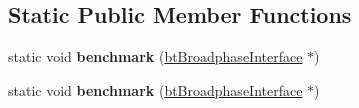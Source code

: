 \subsection*{Static Public Member Functions}
\begin{DoxyCompactItemize}
\item 
\mbox{\label{structbtDbvtBroadphase_a1a8f0b67c8cc09438d1804e9c3d6867e}} 
static void {\bfseries benchmark} (\hyperlink{classbtBroadphaseInterface}{bt\+Broadphase\+Interface} $\ast$)
\item 
\mbox{\label{structbtDbvtBroadphase_abaa963e7c6a73739806780398a81deb3}} 
static void {\bfseries benchmark} (\hyperlink{classbtBroadphaseInterface}{bt\+Broadphase\+Interface} $\ast$)
\end{DoxyCompactItemize}
